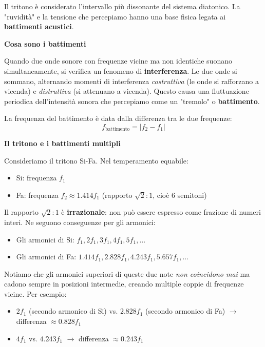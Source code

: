 \begin{fisica}
	\label{phys:battimenti_tritono}
	
	Il tritono è considerato l'intervallo più dissonante del sistema diatonico. La "ruvidità" e la tensione che percepiamo hanno una base fisica legata ai \textbf{battimenti acustici}.
	
	\textbf{Cosa sono i battimenti}
	
	Quando due onde sonore con frequenze vicine ma non identiche suonano simultaneamente, si verifica un fenomeno di \textbf{interferenza}. Le due onde si sommano, alternando momenti di interferenza \textit{costruttiva} (le onde si rafforzano a vicenda) e \textit{distruttiva} (si attenuano a vicenda). Questo causa una fluttuazione periodica dell'intensità sonora che percepiamo come un "tremolo" o \textbf{battimento}.
	
	La frequenza del battimento è data dalla differenza tra le due frequenze:
	\[
	f_{\text{battimento}} = |f_2 - f_1|
	\]
	
	\textbf{Il tritono e i battimenti multipli}
	
	Consideriamo il tritono Si-Fa. Nel temperamento equabile:
	\begin{itemize}
		\item Si: frequenza $f_1$
		\item Fa: frequenza $f_2 \approx 1.414 f_1$ (rapporto $\sqrt{2}:1$, cioè 6 semitoni)
	\end{itemize}
	
	Il rapporto $\sqrt{2}:1$ è \textbf{irrazionale}: non può essere espresso come frazione di numeri interi. Ne seguono conseguenze per gli armonici:
	
	\begin{itemize}
		\item Gli armonici di Si: $f_1, 2f_1, 3f_1, 4f_1, 5f_1, \ldots$
		\item Gli armonici di Fa: $1.414f_1, 2.828f_1, 4.243f_1, 5.657f_1, \ldots$
	\end{itemize}
	
	Notiamo che gli armonici superiori di queste due note \textit{non coincidono mai} ma cadono sempre in posizioni intermedie, creando multiple coppie di frequenze vicine. Per esempio:
	\begin{itemize}
		\item $2f_1$ (secondo armonico di Si) vs. $2.828f_1$ (secondo armonico di Fa) $\rightarrow$ differenza $\approx 0.828f_1$
		\item $4f_1$ vs. $4.243f_1$ $\rightarrow$ differenza $\approx 0.243f_1$
	\end{itemize}
	

\end{fisica}
